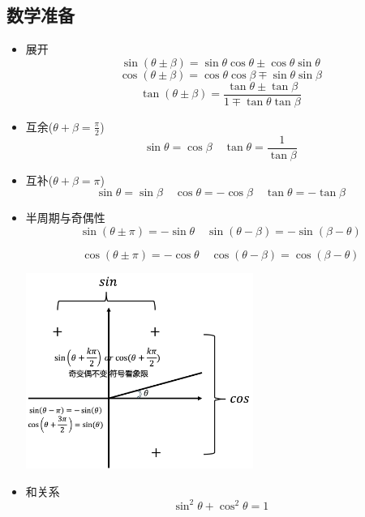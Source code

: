 \documentclass{article}
\begin{document}
\vspace{2em}


\subsection{数学准备}
\begin{formal}
    \begin{itemize}
        \item 展开
              $$ \sin{(\theta \pm \beta)} = \sin{\theta}\cos{\theta} \pm \cos{\theta}\sin{\theta} $$
              $$ \cos{(\theta \pm \beta)} = \cos{\theta}\cos{\beta} \mp \sin{\theta}\sin{\beta} $$
              $$ \tan{(\theta \pm \beta)} = \dfrac{\tan{\theta} \pm \tan{\beta}}{1 \mp \tan{\theta}\tan{\beta}}$$

        \item 互余($\theta + \beta = \frac{\pi}{2}$)
              $$
                  \sin{\theta} = \cos{\beta}  \quad   \tan{\theta} = \frac{1}{\tan{\beta}}
              $$

        \item 互补($\theta + \beta = \pi$)
              $$
                  \sin{\theta} = \sin{\beta} \quad \cos{\theta} = - \cos{\beta}
                  \quad \tan{\theta} = - \tan{\beta}
              $$
        \item 半周期与奇偶性
              $$
                  \sin{(\theta \pm \pi)} = -\sin{\theta}   \quad   \sin{(\theta - \beta)} = - \sin{(\beta - \theta)}
              $$

              $$
                  \cos{(\theta \pm \pi)} = -\cos{\theta}   \quad   \cos{(\theta - \beta)} =  \cos{(\beta - \theta)}
              $$

              \includegraphics[width = 20em]{./pictures/1.png}

        \item 和关系
              $$ \sin^{2}{\theta}+\cos^{2}{\theta} = 1$$


\end{itemize}
\end{formal}
\end{document}
